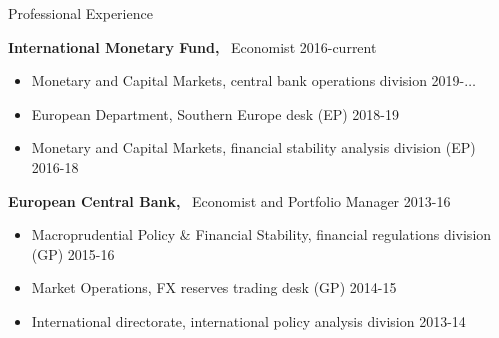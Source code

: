 \documentclass[usegeometry, 10pt, a4paper]{cv} %
\newcommand{\activite}[1]{\textbf{#1}\ }
\begin{document}
\begin{rubriquetableau}[0.95\textwidth]{Professional Experience}\\
\vspace{-0.3cm}

\activite{International Monetary Fund,} Economist \hfill 2016-current \\

\begin{itemize}[label={}]

  
\item Monetary and Capital Markets, central bank operations division \hfill 2019-$\dots$
  
\item European Department, Southern Europe desk (EP) \hfill 2018-19
  
\item Monetary and Capital Markets, financial stability analysis division (EP) \hfill 2016-18
\end{itemize}

\vspace{0.5cm}

\activite{European Central Bank,} Economist and Portfolio Manager \hfill 2013-16 \\

\begin{itemize}[label={}]  
\item Macroprudential Policy \& Financial Stability, financial
  regulations division (GP) \hfill 2015-16
  
\item Market Operations, FX reserves trading desk (GP) \hfill 2014-15
  
\item International directorate, international policy analysis division \hfill 2013-14
\end{itemize}
\end{rubriquetableau}
\end{document}
